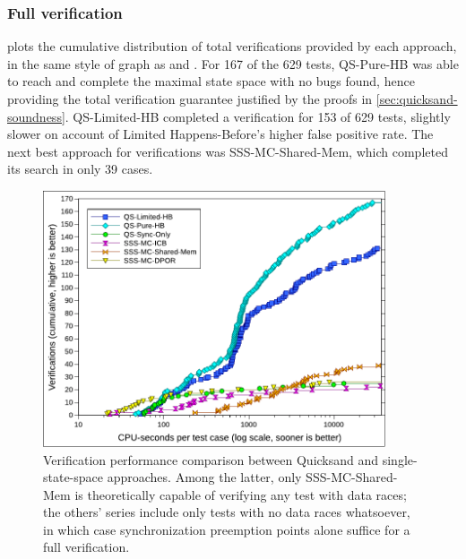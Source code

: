 \subsubsection{Full verification}

 plots the cumulative distribution of total verifications provided by each approach,
in the same style of graph as  and .
For 167 of the 629 tests,
QS-Pure-HB was able to reach and complete the maximal state space with no bugs found,
hence providing the total verification guarantee justified by the proofs in \cref{sec:quicksand-soundness}.
QS-Limited-HB completed a verification for 153 of 629 tests,
slightly slower on account of Limited Happens-Before's higher false positive rate.
The next best approach for verifications was SSS-MC-Shared-Mem, which completed its search in only 39 cases.

\begin{figure}[t]
	\begin{center}
	\includegraphics[width=0.9\textwidth]{../proposal/totalverifs-v2.pdf}
	\end{center}
	\caption[Verification performance comparison
	between Quicksand and prior work.]
	{Verification performance comparison between
	Quicksand and single-state-space approaches.
	Among the latter, only SSS-MC-Shared-Mem is theoretically capable of verifying any test with data races;
	the others' series include only tests with no data races whatsoever,
	in which case synchronization preemption points alone suffice for a full verification.}
	\label{fig:totalverif}
\end{figure}

